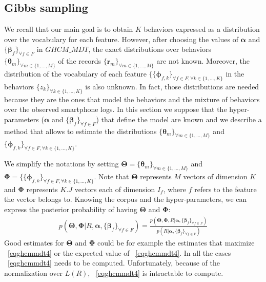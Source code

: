 \subsection{Gibbs sampling} \label{gibbs_sampling}
We recall that our main goal is to obtain $K$ behaviors expressed as a distribution over the vocabulary for each feature. However, after choosing the values of $\boldsymbol{\alpha}$ and $\{\boldsymbol{\beta }_{f}\}_{\forall f\in F}$ in $GHCM\_MDT$, the exact distributions over behaviors $\{\boldsymbol{\theta}_{m}\}_{\forall m\in \{1,...,M\}}$ of the records $\{\mathbf{r}_{m}\}_{\forall m\in \{1,...,M\}}$ are not known. Moreover, the distribution of the vocabulary of each feature $\{\{\boldsymbol{\phi }_{f,k}\}_{\forall f \in F, \forall k\in\{1,...,K\}}$ in the behaviors $\{z_{k}\}_{ \forall k\in\{1,...,K\}}$ is also unknown. In fact, those distributions are needed because they are the ones that model the behaviors and the mixture of behaviors over the observed smartphone logs. In this section we suppose that the hyper-parameters ($\boldsymbol{\alpha}$ and $\{\boldsymbol{\beta }_{f}\}_{\forall f\in F}$) that define the model are known and we describe a method that allows to estimate the distributions $\{\boldsymbol{\theta}_{m}\}_{\forall m\in \{1,...,M\}}$ and $\{\boldsymbol{\phi }_{f,k}\}_{\forall f \in F, \forall k\in\{1,...,K\}}$. \par

We simplify the notations by setting $\boldsymbol{\Theta }=\{\boldsymbol{\theta}_{m}\}_{\forall m\in \{1,...,M\}}$ and $\boldsymbol{\Phi }=\{\{\boldsymbol{\phi }_{f,k}\}_{\forall f \in F, \forall k\in\{1,...,K\}}$. Note that $\boldsymbol{\Theta }$ represents $M$ vectors of dimension $K$ and $\boldsymbol{\Phi }$ represents $K.J$ vectors each of dimension $I_{f}$, where $f$ refers to the feature the vector belongs to. Knowing the corpus and the hyper-parameters, we can express the posterior probability of having $\boldsymbol{\Theta }$ and $\boldsymbol{\Phi }$:
\begin{equation}\label{eqghcmmdt4}
\begin{split} 
p(\boldsymbol{\Theta },\boldsymbol{\Phi }|R, \boldsymbol{\alpha},\{\boldsymbol{\beta }_{f}\}_{\forall f\in F})=\frac{p(\boldsymbol{\Theta },\boldsymbol{\Phi },R| \boldsymbol{\alpha},\{\boldsymbol{\beta }_{f}\}_{\forall f\in F})}{p(R| \boldsymbol{\alpha},\{\boldsymbol{\beta }_{f}\}_{\forall f\in F})}
\end{split} 
\end{equation}
Good estimates for $\boldsymbol{\Theta }$ and $\boldsymbol{\Phi }$ could be for example the estimates that maximize ~\eqref{eqghcmmdt4} or the expected value of ~\eqref{eqghcmmdt4}. In all the cases ~\eqref{eqghcmmdt4} needs to be computed. Unfortunately, because of the normalization over $L(R)$, ~\eqref{eqghcmmdt4} is intractable to compute. \par

